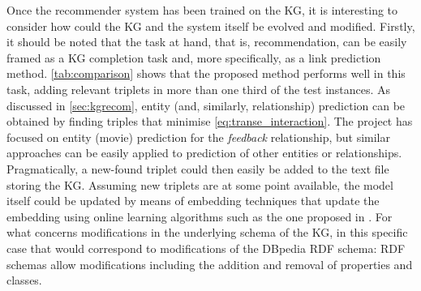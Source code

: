 Once the recommender system has been trained on the KG, it is interesting to consider how could the KG and the system itself be evolved and modified.
Firstly, it should be noted that the task at hand, that is, recommendation, can be easily framed as a KG completion task and, more specifically, as a link prediction method.
\cref{tab:comparison} shows that the proposed method performs well in this task, adding relevant triplets in more than one third of the test instances.
As discussed in \cref{sec:kgrecom}, entity (and, similarly, relationship) prediction can be obtained by finding triples that minimise \cref{eq:transe_interaction}.
The project has focused on entity (movie) prediction for the \emph{feedback} relationship, but similar approaches can be easily applied to prediction of other entities or relationships.
Pragmatically, a new-found triplet could then easily be added to the text file storing the KG.
Assuming new triplets are at some point available, the model itself could be updated by means of embedding techniques that update the embedding using online learning algorithms such as the one proposed in \cite{wu2022efficiently}.
For what concerns modifications in the underlying schema of the KG, in this specific case that would correspond to modifications of the DBpedia RDF schema: RDF schemas allow modifications including the addition and removal of properties and classes.

